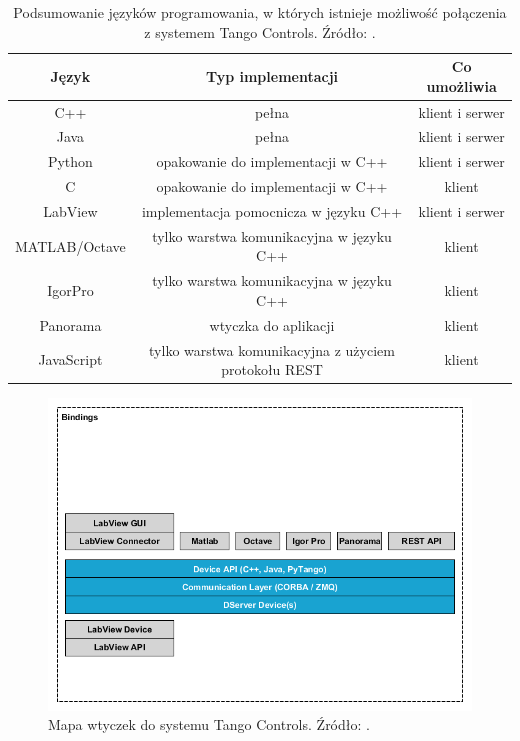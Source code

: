 \begin{table}[hpt]
    \centering
    \begin{tabular}{|c|c|c|}
        \hline 
        \textbf{Język} & \textbf{Typ implementacji} &\textbf{Co umożliwia} \\ 
        \hline 
        C++ & pełna & klient i serwer \\ 
        \hline 
        Java & pełna & klient i serwer \\ 
        \hline 
        Python & opakowanie do implementacji w C++ & klient i serwer \\ 
        \hline 
        C & opakowanie do implementacji w C++ & klient \\ 
        \hline 
        LabView & implementacja pomocnicza w języku C++ & klient i serwer \\ 
        \hline 
        MATLAB/Octave & tylko warstwa komunikacyjna w języku C++ & klient \\ 
        \hline 
        IgorPro & tylko warstwa komunikacyjna w języku C++ & klient \\ 
        \hline 
        Panorama & wtyczka do aplikacji & klient \\ 
        \hline 
        JavaScript & tylko warstwa komunikacyjna z użyciem protokołu REST & klient \\ 
        \hline 
    \end{tabular}
    \caption{Podsumowanie języków programowania, w których istnieje możliwość połączenia z systemem Tango Controls. Źródło: \cite{TangoWebsite}.}
    \label{tab:tango-implementations}
\end{table}

\begin{figure}[ht]
    \centering
    \includegraphics[width=\textwidth]{Grafika/tango_bindings_map1_1}
    \caption{Mapa wtyczek do systemu Tango Controls. Źródło: \cite{TangoDocs}.}\label{fig:tango-bindings}
\end{figure}


